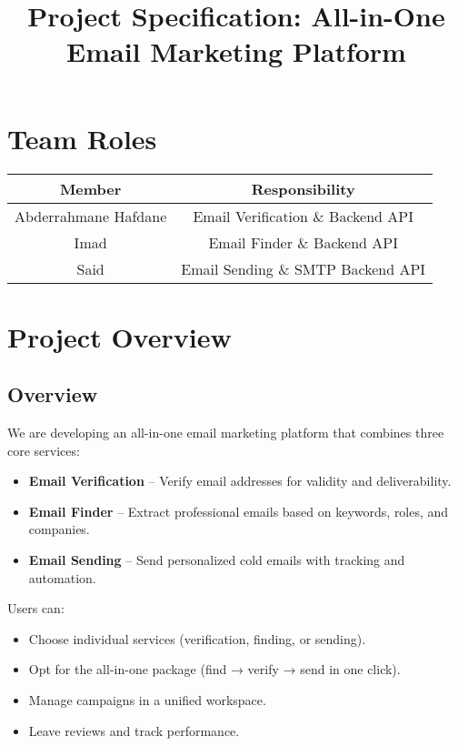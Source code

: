 \documentclass{article}
\title{Project Specification: All-in-One Email Marketing Platform}
\author{}
\date{}
\begin{document}
\maketitle
\tableofcontents
\newpage

\section{Team Roles}
\begin{tabular}{|c|c|}
\hline
\textbf{Member} & \textbf{Responsibility} \\
\hline
Abderrahmane Hafdane & Email Verification \& Backend API \\
\hline
Imad & Email Finder \& Backend API \\
\hline
Said & Email Sending \& SMTP Backend API \\
\hline
\end{tabular}

\section{Project Overview}
\subsection{Overview}
We are developing an all-in-one email marketing platform that combines three core services:
\begin{itemize}
    \item \textbf{Email Verification} – Verify email addresses for validity and deliverability.
    \item \textbf{Email Finder} – Extract professional emails based on keywords, roles, and companies.
    \item \textbf{Email Sending} – Send personalized cold emails with tracking and automation.
\end{itemize}

Users can:
\begin{itemize}
    \item Choose individual services (verification, finding, or sending).
    \item Opt for the all-in-one package (find → verify → send in one click).
    \item Manage campaigns in a unified workspace.
    \item Leave reviews and track performance.
\end{itemize}
\end{document}
